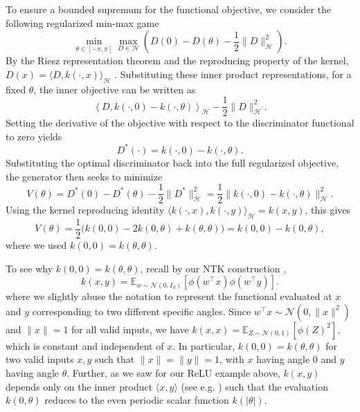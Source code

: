 \documentclass[letter,11pt]{article}
\begin{document}
To ensure a bounded supremum for the functional objective, we consider the following regularized min-max game
\begin{equation}
\min_{\theta \in [-\pi, \pi]} \max_{D \in \mathcal{H}} \left( D(0) - D(\theta) - \frac{1}{2}\|D\|_{\mathcal{H}}^2 \right).
\end{equation}
By the Riesz representation theorem and the reproducing property of the kernel, $D(x) = \langle D, k(\cdot, x) \rangle_{\mathcal{H}}$ \cite{wainwright2019high}. Substituting these inner product representations, for a fixed $\theta$, the inner objective can be written as
$$\left\langle D, k(\cdot,0)-k(\cdot,\theta)\right\rangle_{\mathcal H} -\frac{1}{2}\|D\|_{\mathcal H}^2.$$
Setting the derivative of the objective with respect to the discriminator functional to zero yields
\begin{equation}
D^*(\cdot) = k(\cdot, 0) - k(\cdot, \theta).
\end{equation}
Substituting the optimal discriminator back into the full regularized objective, the generator then seeks to minimize
\begin{equation}
V(\theta) = D^*(0) - D^*(\theta) - \frac{1}{2}\|D^*\|_{\mathcal{H}}^2
= \frac{1}{2}\|k(\cdot,0)-k(\cdot,\theta)\|_{\mathcal{H}}^2.
\end{equation}
Using the kernel reproducing identity $\langle k(\cdot,x),k(\cdot,y)\rangle_{\mathcal H}=k(x,y)$, this gives
\begin{equation}
V(\theta) = \frac{1}{2}\big(k(0,0)-2k(0,\theta)+k(\theta,\theta)\big)
= k(0,0)-k(0,\theta),
\end{equation}
where we used $k(0,0)=k(\theta,\theta)$.

To see why $k(0, 0) = k(\theta, \theta)$, recall by our NTK construction \cite{jacot2018neural},
\begin{equation}
k(x, y) = \mathbb{E}_{w \sim \mathcal{N}(0, I_d)} \left[ \phi(w^\top x) \phi(w^\top y) \right].
\end{equation}
where we slightly abuse the notation to represent the functional evaluated at $x$ and $y$ corresponding to two different specific angles. Since $w^\top x \sim \mathcal{N}(0, \|x\|^2)$ and $\|x\| = 1$ for all valid inputs, we have
$ k(x, x) = \mathbb{E}_{Z \sim \mathcal{N}(0, 1)} \left[ \phi(Z)^2 \right],$
which is constant and independent of $x$. In particular, $k(0, 0) = k(\theta, \theta)$ for two valid inputs $x,y$ such that $\|x\| = \|y\| =1$, with $x$ having angle $0$ and $y$ having angle $\theta$. Further, as we saw for our ReLU example above, $k(x, y)$ depends only on the inner product $\langle x, y \rangle$ (see e.g. \cite{arora2019fine,li2019enhanced,golikov2022neural}) such that the evaluation $k(0, \theta)$ reduces to the even periodic scalar function $k(|\theta|)$.
\end{document}
